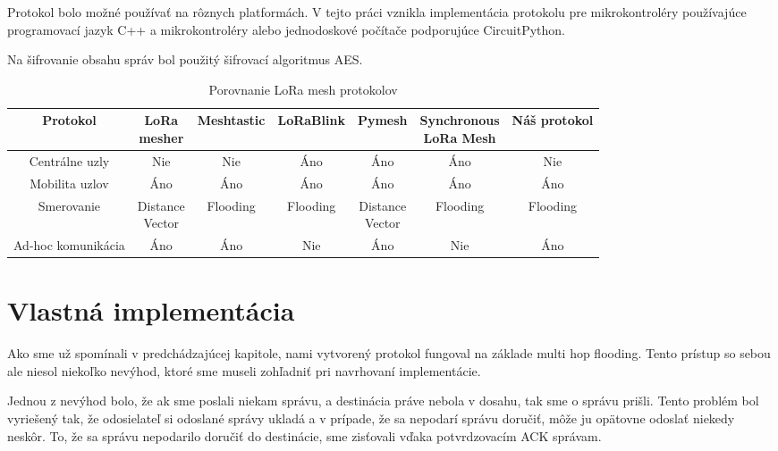 \documentclass[slovak,master]{diploma}
\renewcommand{\thefootnote}{\arabic{footnote}}
\begin{document}
Protokol bolo možné používať na rôznych platformách. V tejto práci vznikla implementácia protokolu pre mikrokontroléry používajúce programovací jazyk C++ a 
mikrokontroléry alebo jednodoskové počítače podporujúce CircuitPython.

Na šifrovanie obsahu správ bol použitý šifrovací algoritmus AES.


\renewcommand{\thefootnote}{\fnsymbol{footnote}}
\begin{table}[!h]
	\centering
  \small
  \setlength\tabcolsep{3pt}
	\caption[Porovnanie LoRa mesh protokolov]{Porovnanie LoRa mesh protokolov}
  \begin{tabular}{c|c|c|c|c|c|c}
    \toprule
    Protokol  & \makecell{LoRa \\ mesher} & Meshtastic & LoRaBlink & Pymesh & \makecell{Synchronous\\ LoRa Mesh} & Náš protokol\\
    \midrule
    Centrálne uzly & Nie & Nie & Áno & Áno & Áno & Nie \\
    \hline
    Mobilita uzlov & Áno\footnotemark[7] & Áno & Áno\footnotemark[1] & Áno\footnotemark[7] & Áno\footnotemark[1] & Áno\\
    \hline
    Smerovanie & \makecell{Distance \\ Vector} & Flooding & Flooding & \makecell{Distance \\ Vector} & Flooding & Flooding\\
    \hline
    Ad-hoc komunikácia & Áno & Áno & Nie & Áno & Nie & Áno \\
    \midrule
  \end{tabular}
  \label{tab:compar}
\end{table}
\renewcommand{\thefootnote}{\arabic{footnote}}

\chapter{Vlastná implementácia}
Ako sme už spomínali v predchádzajúcej kapitole, nami vytvorený protokol fungoval na základe multi hop flooding. Tento prístup so sebou ale niesol 
niekoľko nevýhod, ktoré sme museli zohľadniť pri navrhovaní implementácie.

Jednou z nevýhod bolo, že ak sme poslali niekam správu, a destinácia práve nebola v dosahu, tak sme o správu prišli. Tento problém bol vyriešený tak, 
že odosielateľ si odoslané správy ukladá a v prípade, že sa nepodarí správu doručiť, môže ju opätovne 
odoslať niekedy neskôr. To, že sa správu nepodarilo doručiť do destinácie, sme zisťovali vďaka potvrdzovacím ACK správam. 
\end{document}
